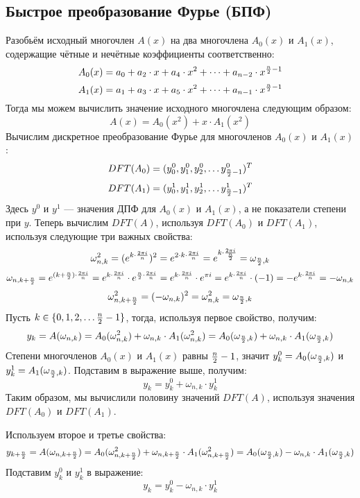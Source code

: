 \subsection*{Быстрое преобразование Фурье (БПФ)}
Разобьём исходный многочлен $A(x)$ на два многочлена $A_0(x)$ и $A_1(x)$, содержащие чётные и нечётные коэффициенты соответственно:
$$A_0(x) = a_0 + a_2 \cdot x + a_4 \cdot x ^ 2 + \dots + a_{n - 2} \cdot x ^ {{n \over 2} - 1}$$
$$A_1(x) = a_1 + a_3 \cdot x + a_5 \cdot x ^ 2 + \dots + a_{n - 1} \cdot x ^ {{n \over 2} - 1}$$
Тогда мы можем вычислить значение исходного многочлена следующим образом:
$$ A(x) = A_0(x ^ 2) + x \cdot A_1(x ^ 2) $$
Вычислим дискретное преобразование Фурье для многочленов $A_0(x)$ и $A_1(x)$:
$$ DFT(A_0) = (y^0_0, y^0_1, y^0_2, \dots y^0_{ {n \over 2} - 1}) ^ T $$
$$ DFT(A_1) = (y^1_0, y^1_1, y^1_2, \dots y^1_{ {n \over 2} - 1}) ^ T $$
Здесь $y^0$ и $y^1$ --- значения ДПФ для $A_0(x)$ и $A_1(x)$, а не показатели степени при $y$.
Теперь вычислим $DFT(A)$, используя $DFT(A_0)$ и $DFT(A_1)$, используя следующие три важных свойства:
$$ {\omega^2_{n, k}} = (e ^ {k \cdot {{2 \pi i} \over {n}}}) ^ 2 = e ^ {2 \cdot k \cdot {{2 \pi i} \over {n}}} = e ^ {k \cdot {{2 \pi i} \over {n \over 2}}} = {{\omega}_{{n \over 2}, k}} $$
$$ {{\omega}_{n, {k + {n \over 2}}}} = e ^ {{(k + {n \over 2})} \cdot {{2 \pi i} \over {n}}} = e ^ {k \cdot {{2 \pi i} \over {n}}} \cdot e ^ {{n \over 2} \cdot {{2 \pi i} \over {n}}} = e ^ {k \cdot {{2 \pi i} \over {n}}} \cdot e ^ {\pi i} = e ^ {k \cdot {{2 \pi i} \over {n}}} \cdot (-1) = -e ^ {k \cdot {{2 \pi i} \over {n}}} = -{{\omega}_{n, k}} $$
$$ {\omega^2_{n, {k + {n \over 2}}}} = (-{{\omega}_{n, k}}) ^ 2 = {\omega^2_{n, k}} =  {{\omega}_{{n \over 2}, k}}$$
Пусть $k \in \{ 0, 1, 2, \dots {n \over 2} - 1 \}$, тогда, используя первое свойство, получим:
$$ y_k = A(\omega_{n, k}) = A_0(\omega ^ 2_{n, k}) + \omega_{n, k} \cdot A_1(\omega ^ 2_{n, k}) = A_0({{\omega}_{{n \over 2}, k}}) + \omega_{n, k} \cdot A_1({{\omega}_{{n \over 2}, k}}) $$
Степени многочленов $A_0(x)$ и $A_1(x)$ равны ${n \over 2} - 1$, значит $y^0_k = A_0({{\omega}_{{n \over 2}, k}})$ и $y^1_k = A_1({{\omega}_{{n \over 2}, k}})$. Подставим в выражение выше, получим:
$$ y_k = y^0_k + \omega_{n, k} \cdot y^1_k $$
Таким образом, мы вычислили половину значений $DFT(A)$, используя значения $DFT(A_0)$ и $DFT(A_1)$.

Используем второе и третье свойства:
$$ y_{k + {n \over 2}} = A(\omega_{n, {k + {n \over 2}}}) = A_0(\omega ^ 2_{n, {k + {n \over 2}}}) + \omega_{n, {k + {n \over 2}}} \cdot A_1(\omega ^ 2_{n, {k + {n \over 2}}}) = A_0({{\omega}_{{n \over 2}, k}}) - \omega_{n, k} \cdot A_1({{\omega}_{{n \over 2}, k}}) $$
Подставим $y^0_k$ и $y^1_k$ в выражение:
$$ y_k = y^0_k - \omega_{n, k} \cdot y^1_k $$

